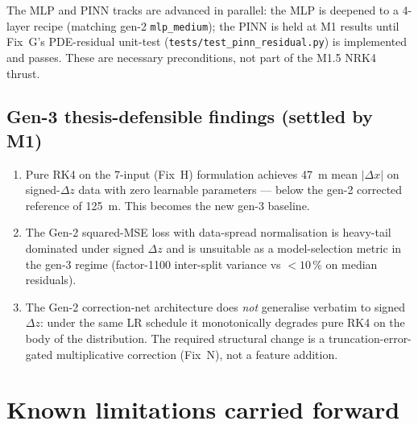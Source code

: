 \documentclass[a4paper,11pt]{article}
\newcommand{\SI}[2]{#1~#2}
\newcommand{\dz}{\Delta z}
\begin{document}
The MLP and PINN tracks are advanced in parallel: the MLP is
deepened to a 4-layer recipe (matching gen-2 \texttt{mlp\_medium});
the PINN is held at M1 results until Fix~G's PDE-residual
unit-test (\texttt{tests/test\_pinn\_residual.py}) is implemented
and passes.  These are necessary preconditions, not part of the
M1.5 NRK4 thrust.

\subsection*{Gen-3 thesis-defensible findings (settled by M1)}

\begin{enumerate}
  \item Pure RK4 on the 7-input (Fix~H) formulation achieves
        \SI{47}{\mu m} mean $|\Delta x|$ on signed-$\dz$ data
        with zero learnable parameters --- below the gen-2
        corrected reference of \SI{125}{\mu m}.  This becomes
        the new gen-3 baseline.
  \item The Gen-2 squared-MSE loss with data-spread normalisation
        is heavy-tail dominated under signed $\dz$ and is unsuitable
        as a model-selection metric in the gen-3 regime
        (factor-1100 inter-split variance vs $<10\,\%$ on
        median residuals).
  \item The Gen-2 correction-net architecture does \emph{not}
        generalise verbatim to signed $\dz$: under the same
        LR schedule it monotonically degrades pure RK4 on
        the body of the distribution.  The required structural
        change is a truncation-error-gated multiplicative
        correction (Fix~N), not a feature addition.
\end{enumerate}

\section{Known limitations carried forward}\label{gen3:sec:limits}
\end{document}
